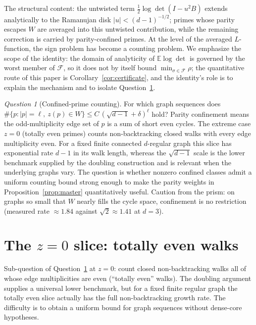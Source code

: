 \documentclass[11pt]{article}
\theoremstyle{remark}
\newtheorem{question}[lemma]{Question}
\begin{document}
The structural content: the untwisted term $\tfrac12\log\det(I-u^2B)$
extends analytically to the Ramanujan disk $|u|<(d-1)^{-1/2}$; primes
whose parity escapes $W$ are averaged into this untwisted contribution,
while the remaining correction is carried by parity-confined primes. At the level of the averaged $L$-function, the sign problem has
become a counting problem. We emphasize the scope of the identity: the
domain of analyticity of $\mathbb E\log\det$ is governed by the worst
member of $\mathcal F$, so it does not by itself bound
$\min_{\sigma\in\mathcal F}\rho$; the quantitative route of this
paper is Corollary~\ref{cor:certificate}, and the identity's role is
to explain the mechanism and to isolate Question~\ref{q:confined}.

\begin{question}[Confined-prime counting]\label{q:confined}
For which graph sequences does
$\#\{p:|p|=\ell,\ z(p)\in W\}\le C\,(\sqrt{d-1}+\delta)^{\ell}$ hold?
Parity confinement means the odd-multiplicity edge set of $p$ is a sum
of short even cycles. The extreme case $z=0$ (totally even primes) counts
non-backtracking closed walks with every edge multiplicity even. For a fixed
finite connected $d$-regular graph this slice has exponential rate $d-1$ in
its walk length, whereas the $\sqrt{d-1}$ scale is the lower benchmark supplied
by the doubling construction and is relevant when the underlying graphs vary.
The question is whether nonzero confined classes admit a uniform counting bound
strong enough to make the parity weights in Proposition~\ref{prop:master}
quantitatively useful. Caution from the prism: on graphs so small that $W$
nearly fills the cycle space, confinement is no restriction (measured rate
$\approx1.84$ against $\sqrt2\approx1.41$ at $d=3$).
\end{question}

\section{\texorpdfstring{The $z=0$ slice: totally even walks}{The z=0 slice: totally even walks}}\label{sec:even}

Sub-question of Question~\ref{q:confined} at $z=0$: count closed
non-backtracking walks all of whose edge multiplicities are even
(``totally even'' walks). The doubling argument supplies a universal lower benchmark, but for a fixed finite
regular graph the totally even slice actually has the full non-backtracking growth rate.
The difficulty is to obtain a uniform bound for graph sequences without dense-core hypotheses.
\end{document}
